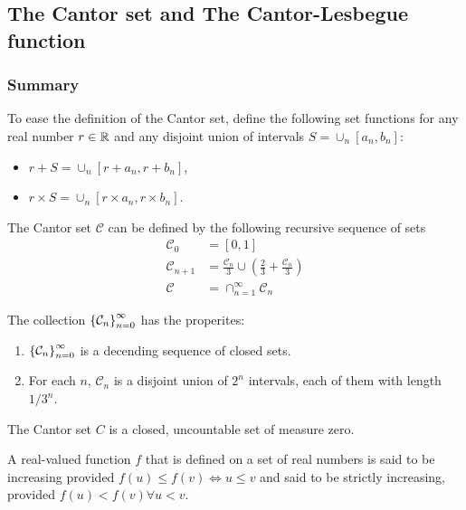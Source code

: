 \newcommand{\cantor}{\mathcal{C}}
\newcommand{\Ocal}{\mathcal{O}}
\newcommand{\union}{\cup}
\newcommand{\intersect}{\cap}


\subsection{The Cantor set and The Cantor-Lesbegue function}
\subsubsection{Summary}

\noindent To ease the definition of the Cantor set, define the following set functions 
for any real number $r\in \mathbb{R}$ and any disjoint union of intervals $S = \union_n [a_n, b_n]$:
\begin{itemize}
    \item $r + S = \union_n \left[r+a_n, r+b_n\right]$,
    \item $r\times S = \union_n \left[r\times a_n, r\times b_n\right]$.
\end{itemize}

\begin{defn}
    The Cantor set $\cantor$ can be defined by the following recursive sequence of sets
    \begin{align}
        \cantor_0 &= [0,1] \\
        \cantor_{n+1} &= \frac{\cantor_n}{3} \union \left(\frac{2}{3} + \frac{\cantor_n}{3}\right) \\
        \cantor &= \intersect_{n=1}^{\infty} \cantor_n
    \end{align}
\end{defn}

\noindent The collection $\seq{\cantor_n}_{n=0}^{\infty}$ has the properites:
\begin{enumerate}[label=(\roman*)]
    \item $\seq{\cantor_n}_{n=0}^{\infty}$ is a decending sequence of closed sets.
    \item For each $n$, $\cantor_{n}$ is a disjoint union of $2^n$ intervals, each of them with length $1/3^n$.
\end{enumerate}

\begin{thm}
    The Cantor set $C$ is a closed, uncountable set of measure zero.
\end{thm}


\noindent A real-valued function $f$ that is defined on a set of real numbers is said to be
increasing provided $f(u) \leq f(v) \iff u \leq v$ and said to be strictly increasing, provided
$f(u) < f(v) \forall u < v$.



